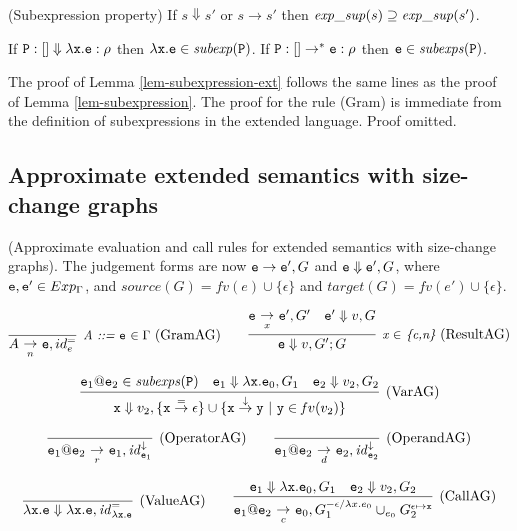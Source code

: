 \documentclass{LMCS}
\newcommand{\bdfn}{\begin{defi}}
\newcommand{\edfn}{\end{defi}}
\newcommand{\blem}{\begin{lem}}
\newcommand{\elem}{\end{lem}}
\newcommand{\bcor}{\begin{cor}}
\newcommand{\ecor}{\end{cor}}
\theoremstyle{definition}\newtheorem{env}[thm]{Environment}
\newcommand{\tosub}[1]{\raisebox{-6.0pt}{$\ \stackrel{\textstyle\to}{\vrule height4.5 pt width0 pt
    depth2.5 pt \smash{\scriptstyle#1}}\ $}}
\begin{document}
\blem \label{lem-subexpression-ext}
{\rm (Subexpression property)} If $s\Downarrow s'$ or $s\to s'$ then
${\it exp\_sup}(s)\supseteq {\it exp\_sup}(s')$.
\elem
\bcor If
${\tt P}:[]\Downarrow \lambda{\tt x.e}:\rho$ then
$\lambda{\tt x.e}\in{\it subexp}({\tt P})$. If
${\tt P}:[]\to^* {\tt e}:\rho$ then
${\tt e}\in{\it subexps}({\tt P})$.
\ecor

The proof of Lemma \ref{lem-subexpression-ext} follows the same lines
as the proof of Lemma \ref{lem-subexpression}. The proof for the rule
(Gram) is immediate from the definition of subexpressions in the
extended language. Proof omitted.


\subsection{Approximate extended semantics with size-change graphs}
\bdfn
\label{def-Ext-eval-approx}
{\rm(Approximate evaluation and call rules for extended semantics with size-change graphs)}. 
The judgement forms are now  ${\tt e}\to{\tt e}', G$ and
${\tt e}\Downarrow{\tt e}', G$, where ${\tt e},{\tt e}'\in Exp_\Gamma$, and $source(G) = \mathit{fv}(e)\cup \{\epsilon\}$ and  $target(G)=\mathit{fv}(e')\cup \{\epsilon\}$.

$$
\infer[{\mbox{{\it \small A ::= {\tt e} $\in \Gamma$\ }}}(\textnormal{GramAG})]
{A\tosub{n} {\tt e}, id_e^=}
{}
\qquad
\infer[{\mbox{{\it \small x $\in$  \{c,n\}\ }}}(\textnormal{ResultAG})]
{{\tt e}\Downarrow v,
G';G}
{{\tt e}\tosub{x} {\tt e}',G'
  &
  {\tt e}'\Downarrow v,G}
$$

$$
\infer[(\textnormal{VarAG})]
{{\tt x}\Downarrow v_2,
  \{{\tt x}\stackrel{=}{\to}{\epsilon}\}
  \cup\{ {\tt x}\stackrel{\downarrow}{\to}{\tt y}
         \ |\ {\tt y} \in {\mathit fv}(v_2)\}}
{{\tt e}_1{\tt@e}_2\in{\it subexps}({\tt P})
  &
  {\tt e}_1\Downarrow\lambda{\tt x.e}_0,G_1
  &
   {\tt e}_2\Downarrow v_2,G_2}
$$

$$
\infer[(\textnormal{OperatorAG})]
{{\tt e}_1{\tt@e}_2\tosub{r}{\tt e}_1,{\it id}^\downarrow_{{\tt e}_1}}
{}
\qquad
\infer[(\textnormal{OperandAG})]
{{\tt e}_1{\tt@e}_2\tosub{d}{\tt e}_2,{\it id}^\downarrow_{{\tt e}_2}}
{}
$$

$$
\infer[(\textnormal{ValueAG})]{\lambda{\tt x.e} \Downarrow
  \lambda{\tt x.e},{\it id}^=_{\lambda{\tt x.e}}}{}
\qquad
\infer[(\textnormal{CallAG})]
{{\tt e}_1{\tt@e}_2\tosub{c} {\tt e}_0,G_1^{-\epsilon/\lambda x.e_0}\cup_{e_0}
                                        G^{\epsilon\mapsto{\tt x}}_2}
{{\tt e}_1\Downarrow\lambda{\tt x.e}_0,G_1
  &
  {\tt e}_2\Downarrow v_2,G_2}
$$
\edfn
\medskip
\end{document}
